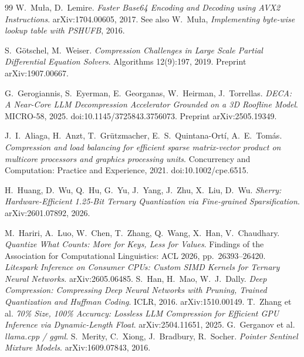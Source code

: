 \documentclass[11pt,a4paper]{article}
\begin{document}
\begin{thebibliography}{99}
 W.~Mu{\l}a, D.~Lemire. \emph{Faster Base64 Encoding and
  Decoding using AVX2 Instructions}. arXiv:1704.00605, 2017. See also
  W.~Mu{\l}a, \emph{Implementing byte-wise lookup table with PSHUFB}, 2016.

 S.~G\"otschel, M.~Weiser. \emph{Compression Challenges in
  Large Scale Partial Differential Equation Solvers}. Algorithms 12(9):197,
  2019. Preprint arXiv:1907.00667.

 G.~Gerogiannis, S.~Eyerman, E.~Georganas, W.~Heirman,
  J.~Torrellas. \emph{DECA: A Near-Core LLM Decompression Accelerator Grounded
  on a 3D Roofline Model}. MICRO-58, 2025. doi:10.1145/3725843.3756073.
  Preprint arXiv:2505.19349.

 J.~I.~Aliaga, H.~Anzt, T.~Gr\"utzmacher, E.~S.~Quintana-Ort\'i,
  A.~E.~Tom\'as. \emph{Compression and load balancing for efficient sparse
  matrix-vector product on multicore processors and graphics processing units}.
  Concurrency and Computation: Practice and Experience, 2021.
  doi:10.1002/cpe.6515.

 H.~Huang, D.~Wu, Q.~Hu, G.~Yu, J.~Yang, J.~Zhu, X.~Liu,
  D.~Wu. \emph{Sherry: Hardware-Efficient 1.25-Bit Ternary Quantization via
  Fine-grained Sparsification}. arXiv:2601.07892, 2026.

 M.~Hariri, A.~Luo, W.~Chen, T.~Zhang, Q.~Wang, X.~Han,
  V.~Chaudhary. \emph{Quantize What Counts: More for Keys, Less for Values}.
  Findings of the Association for Computational Linguistics: ACL 2026,
  pp.~26393--26420.
 \emph{Litespark Inference on Consumer CPUs: Custom SIMD
  Kernels for Ternary Neural Networks}. arXiv:2605.06485.
 S.~Han, H.~Mao, W.~J.~Dally. \emph{Deep Compression:
  Compressing Deep Neural Networks with Pruning, Trained Quantization and
  Huffman Coding}. ICLR, 2016. arXiv:1510.00149.
 T.~Zhang et al. \emph{70\% Size, 100\% Accuracy: Lossless LLM
  Compression for Efficient GPU Inference via Dynamic-Length Float}.
  arXiv:2504.11651, 2025.
 G.~Gerganov et al. \emph{llama.cpp / ggml}.
 S.~Merity, C.~Xiong, J.~Bradbury, R.~Socher. \emph{Pointer
  Sentinel Mixture Models}. arXiv:1609.07843, 2016.
\end{thebibliography}
\end{document}
